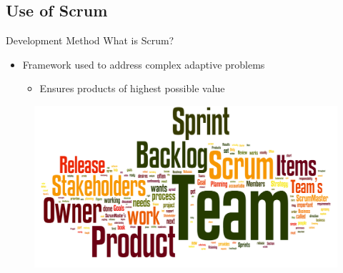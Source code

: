 \subsection{Use of Scrum}
\begin{frame}{Development Method}
  What is Scrum?
  \begin{itemize}
  \item Framework used to address complex adaptive problems
    \begin{itemize}
    \item Ensures products of highest possible value
    \end{itemize}
  \end{itemize}

	\begin{figure}
		\includegraphics[width=1\textwidth]{slides/agile-glossary.png}
	\end{figure}
\end{frame}

